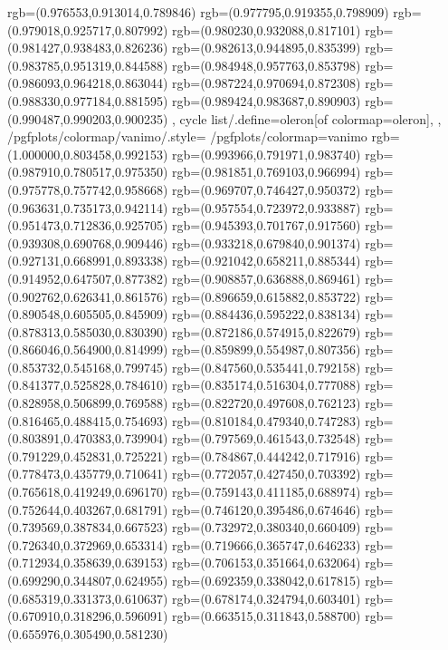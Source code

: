 {{{			rgb=(0.976553,0.913014,0.789846)
			rgb=(0.977795,0.919355,0.798909)
			rgb=(0.979018,0.925717,0.807992)
			rgb=(0.980230,0.932088,0.817101)
			rgb=(0.981427,0.938483,0.826236)
			rgb=(0.982613,0.944895,0.835399)
			rgb=(0.983785,0.951319,0.844588)
			rgb=(0.984948,0.957763,0.853798)
			rgb=(0.986093,0.964218,0.863044)
			rgb=(0.987224,0.970694,0.872308)
			rgb=(0.988330,0.977184,0.881595)
			rgb=(0.989424,0.983687,0.890903)
			rgb=(0.990487,0.990203,0.900235)
		},
	cycle list/.define={oleron}{[of colormap=oleron]},
	},
	/pgfplots/colormap/vanimo/.style={
		/pgfplots/colormap={vanimo}{%
			rgb=(1.000000,0.803458,0.992153)
			rgb=(0.993966,0.791971,0.983740)
			rgb=(0.987910,0.780517,0.975350)
			rgb=(0.981851,0.769103,0.966994)
			rgb=(0.975778,0.757742,0.958668)
			rgb=(0.969707,0.746427,0.950372)
			rgb=(0.963631,0.735173,0.942114)
			rgb=(0.957554,0.723972,0.933887)
			rgb=(0.951473,0.712836,0.925705)
			rgb=(0.945393,0.701767,0.917560)
			rgb=(0.939308,0.690768,0.909446)
			rgb=(0.933218,0.679840,0.901374)
			rgb=(0.927131,0.668991,0.893338)
			rgb=(0.921042,0.658211,0.885344)
			rgb=(0.914952,0.647507,0.877382)
			rgb=(0.908857,0.636888,0.869461)
			rgb=(0.902762,0.626341,0.861576)
			rgb=(0.896659,0.615882,0.853722)
			rgb=(0.890548,0.605505,0.845909)
			rgb=(0.884436,0.595222,0.838134)
			rgb=(0.878313,0.585030,0.830390)
			rgb=(0.872186,0.574915,0.822679)
			rgb=(0.866046,0.564900,0.814999)
			rgb=(0.859899,0.554987,0.807356)
			rgb=(0.853732,0.545168,0.799745)
			rgb=(0.847560,0.535441,0.792158)
			rgb=(0.841377,0.525828,0.784610)
			rgb=(0.835174,0.516304,0.777088)
			rgb=(0.828958,0.506899,0.769588)
			rgb=(0.822720,0.497608,0.762123)
			rgb=(0.816465,0.488415,0.754693)
			rgb=(0.810184,0.479340,0.747283)
			rgb=(0.803891,0.470383,0.739904)
			rgb=(0.797569,0.461543,0.732548)
			rgb=(0.791229,0.452831,0.725221)
			rgb=(0.784867,0.444242,0.717916)
			rgb=(0.778473,0.435779,0.710641)
			rgb=(0.772057,0.427450,0.703392)
			rgb=(0.765618,0.419249,0.696170)
			rgb=(0.759143,0.411185,0.688974)
			rgb=(0.752644,0.403267,0.681791)
			rgb=(0.746120,0.395486,0.674646)
			rgb=(0.739569,0.387834,0.667523)
			rgb=(0.732972,0.380340,0.660409)
			rgb=(0.726340,0.372969,0.653314)
			rgb=(0.719666,0.365747,0.646233)
			rgb=(0.712934,0.358639,0.639153)
			rgb=(0.706153,0.351664,0.632064)
			rgb=(0.699290,0.344807,0.624955)
			rgb=(0.692359,0.338042,0.617815)
			rgb=(0.685319,0.331373,0.610637)
			rgb=(0.678174,0.324794,0.603401)
			rgb=(0.670910,0.318296,0.596091)
			rgb=(0.663515,0.311843,0.588700)
			rgb=(0.655976,0.305490,0.581230)
}}}
